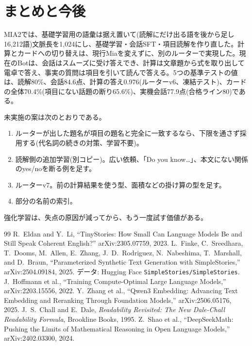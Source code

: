 \documentclass[a4paper,11pt]{article}
\begin{document}
\section{まとめと今後}
MIA2では、基礎学習用の語彙は据え置いて(読解にだけ出る語を後から足し16,212語)文脈長を1,024にし、基礎学習・会話SFT・項目読解を作り直した。計算とカードへの切り替えは、現行Miaを変えずに、別のルーターで実現した。現在のBotは、会話はスムーズに受け答えでき、計算は文章題から式を取り出して電卓で答え、事実の質問は項目を引いて読んで答える。5つの基準テストの値は、読解80\%、会話84.6点、計算の答え0.976(ルーターv6、凍結テスト)、カードの全体70.4\%(項目にない話題の断り65.6\%)、実機会話77.9点(合格ライン80)である。

未実施の案は次のとおりである。
\begin{enumerate}
\item ルーターが出した題名が項目の題名と完全に一致するなら、下限を通さず採用する(代名詞の続きの対策、学習不要)。
\item 読解側の追加学習(別コピー)。広い依頼、「Do you know\dots」、本文にない関係のyes/noを断る例を足す。
\item ルーターv7。前の計算結果を使う型、面積などの掛け算の型を足す。
\item 部分の名前の索引。
\end{enumerate}
強化学習は、失点の原因が減ってから、もう一度試す価値がある。

\begin{thebibliography}{99}
 R.~Eldan and Y.~Li, ``TinyStories: How Small Can Language Models Be and Still Speak Coherent English?'' arXiv:2305.07759, 2023.
 L.~Finke, C.~Sreedhara, T.~Dooms, M.~Allen, E.~Zhang, J.~D.~Rodriguez, N.~Nabeshima, T.~Marshall, and D.~Braun, ``Parameterized Synthetic Text Generation with SimpleStories,'' arXiv:2504.09184, 2025. データ: Hugging Face \texttt{SimpleStories/SimpleStories}.
 J.~Hoffmann et al., ``Training Compute-Optimal Large Language Models,'' arXiv:2203.15556, 2022.
 Y.~Zhang et al., ``Qwen3 Embedding: Advancing Text Embedding and Reranking Through Foundation Models,'' arXiv:2506.05176, 2025.
 J.~S.~Chall and E.~Dale, \textit{Readability Revisited: The New Dale-Chall Readability Formula}, Brookline Books, 1995.
 Z.~Shao et al., ``DeepSeekMath: Pushing the Limits of Mathematical Reasoning in Open Language Models,'' arXiv:2402.03300, 2024.
\end{thebibliography}
\end{document}
